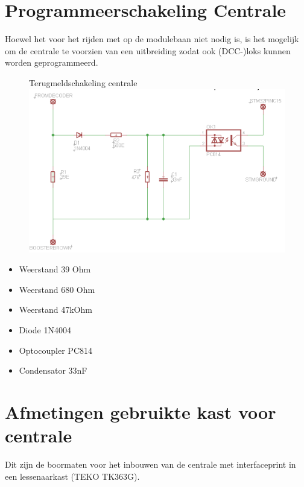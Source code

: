 \documentclass[12pt,a4paper]{report}
\begin{document}
\chapter{Programmeerschakeling Centrale}

Hoewel het voor het rijden met op de modulebaan niet nodig is, is het mogelijk om de centrale te voorzien van een uitbreiding zodat ook (DCC-)loks kunnen worden geprogrammeerd.

\begin{figure}[ht]
  \captionbox
  {Terugmeldschakeling centrale}
  {\includegraphics[scale=0.7]{images/rcu-MDRRCII-ack}}
\end{figure}

\begin{itemize}
\item Weerstand 39 Ohm
\item Weerstand 680 Ohm
\item Weerstand 47kOhm
\item Diode 1N4004
\item Optocoupler PC814
\item Condensator 33nF
\end{itemize}

\chapter{Afmetingen gebruikte kast voor centrale}

Dit zijn de boormaten voor het inbouwen van de centrale met interfaceprint in een lessenaarkast (TEKO TK363G).
\end{document}
